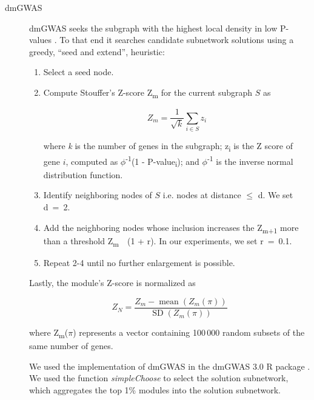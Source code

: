 \documentclass[twocolumn, 11pt]{article}
\begin{document}
\begin{description}
\item[{dmGWAS}] dmGWAS seeks the subgraph with the highest local density in low P-values \cite{jia_dmgwas:_2011}. To that end it searches candidate subnetwork solutions using a greedy, ``seed and extend'', heuristic:

\begin{enumerate}
\item Select a seed node.
\item Compute Stouffer's Z-score Z\textsubscript{m} for the current subgraph $S$ as

\begin{equation*} 
Z_m = \frac{1}{\sqrt{k}} \sum_{i \in S} z_i
\end{equation*}

where \emph{k} is the number of genes in the subgraph; z\textsubscript{i} is the Z score of gene $i$, computed as \(\phi\)\textsuperscript{-1}(1 - P-value\textsubscript{i}); and \(\phi\)\textsuperscript{-1} is the inverse normal distribution function.
\item Identify neighboring nodes of $S$ i.e. nodes at distance \(\le\) d. We set d~=~2.
\item Add the neighboring nodes whose inclusion increases the Z\textsubscript{m+1} more than a threshold Z\textsubscript{m}~\texttimes{}~(1 + r). In our experiments, we set r~=~0.1.
\item Repeat 2-4 until no further enlargement is possible.
\end{enumerate}

Lastly, the module's Z-score is normalized as

\begin{equation*}
Z_{N}=\frac{Z_{m}-\operatorname{mean}\left(Z_{m}(\pi)\right)}{\operatorname{SD}\left(Z_{m}(\pi)\right)}
\end{equation*} 

where Z\textsubscript{m}(\(\pi\)) represents a vector containing 100\,000 random subsets of the same number of genes.

We used the implementation of dmGWAS in the dmGWAS 3.0 R package \cite{dmgwas}. We used the function \emph{simpleChoose} to select the solution subnetwork, which aggregates the top 1\% modules into the solution subnetwork.
\end{description}
\end{document}
